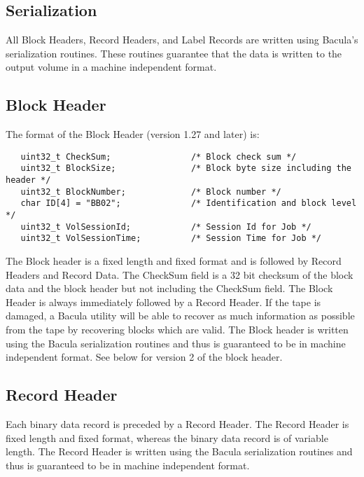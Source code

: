 \subsection*{Serialization}

All Block Headers, Record Headers, and Label Records are written using
Bacula's serialization routines. These routines guarantee that the data is
written to the output volume in a machine independent format. 

\subsection*{Block Header}

The format of the Block Header (version 1.27 and later) is: 

\footnotesize
\begin{verbatim}
   uint32_t CheckSum;                /* Block check sum */
   uint32_t BlockSize;               /* Block byte size including the header */
   uint32_t BlockNumber;             /* Block number */
   char ID[4] = "BB02";              /* Identification and block level */
   uint32_t VolSessionId;            /* Session Id for Job */
   uint32_t VolSessionTime;          /* Session Time for Job */
\end{verbatim}
\normalsize

The Block header is a fixed length and fixed format and is followed by Record
Headers and Record Data. The CheckSum field is a 32 bit checksum of the block
data and the block header but not including the CheckSum field. The Block
Header is always immediately followed by a Record Header. If the tape is
damaged, a Bacula utility will be able to recover as much information as
possible from the tape by recovering blocks which are valid. The Block header
is written using the Bacula serialization routines and thus is guaranteed to
be in machine independent format. See below for version 2 of the block header.


\subsection*{Record Header}

Each binary data record is preceded by a Record Header. The Record Header is
fixed length and fixed format, whereas the binary data record is of variable
length. The Record Header is written using the Bacula serialization routines
and thus is guaranteed to be in machine independent format. 

